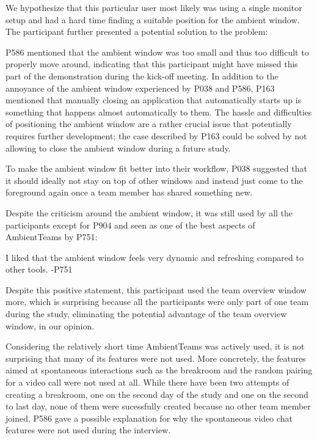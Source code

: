 We hypothesize that this particular user most likely was using a single monitor setup and had a hard time finding a suitable position for the ambient window. The participant further presented a potential solution to the problem:

P586 mentioned that the ambient window was too small and thus too difficult to properly move around, indicating that this participant might have missed this part of the demonstration during the kick-off meeting. In addition to the annoyance of the ambient window experienced by P038 and P586, P163 mentioned that manually closing an application that automatically starts up is something that happens almost automatically to them. The hassle and difficulties of positioning the ambient window are a rather crucial issue that potentially requires further development; the case described by P163 could be solved by not allowing to close the ambient window during a future study.

To make the ambient window fit better into their workflow, P038 suggested that it should ideally not stay on top of other windows and instead just come to the foreground again once a team member has shared something new.

Despite the criticism around the ambient window, it was still used by all the participants except for P904 and seen as one of the best aspects of AmbientTeams by P751:

\begin{displayquote}
    I liked that the ambient window feels very dynamic and refreshing compared to other tools. -P751
\end{displayquote}

Despite this positive statement, this participant used the team overview window more, which is surprising because all the participants were only part of one team during the study, eliminating the potential advantage of the team overview window, in our opinion.

Considering the relatively short time AmbientTeams was actively used, it is not surprising that many of its features were not used. More concretely, the features aimed at spontaneous interactions such as the breakroom and the random pairing for a video call were not used at all. While there have been two attempts of creating a breakroom, one on the second day of the study and one on the second to last day, none of them were sucessfully created because no other team member joined. P586 gave a possible explanation for why the spontaneous video chat features were not used during the interview.

